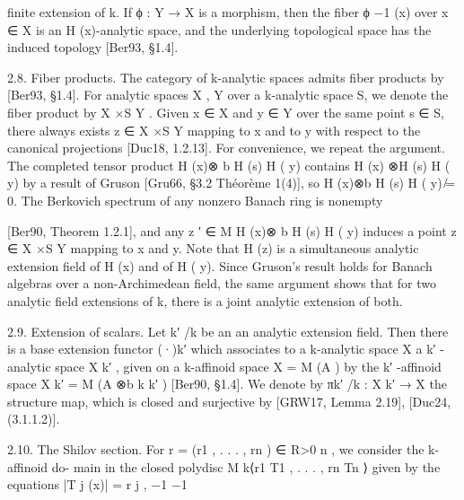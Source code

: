 \documentclass[
  10pt,
]{article}
\newenvironment{Shaded}{}{}
\newcommand{\NormalTok}[1]{#1}
\begin{document}
\begin{Shaded}
\begin{Highlighting}[]
\NormalTok{finite extension of k.}
\NormalTok{   If ϕ : Y → X is a morphism, then the fiber ϕ −1 (x) over x ∈ X is an H (x){-}analytic}
\NormalTok{space, and the underlying topological space has the induced topology [Ber93, §1.4].}

\NormalTok{2.8. Fiber products. The category of k{-}analytic spaces admits fiber products by [Ber93,}
\NormalTok{§1.4]. For analytic spaces X , Y over a k{-}analytic space S, we denote the fiber product by}
\NormalTok{X ×S Y . Given x ∈ X and y ∈ Y over the same point s ∈ S, there always exists z ∈ X ×S Y}
\NormalTok{mapping to x and to y with respect to the canonical projections [Duc18, 1.2.13]. For}
\NormalTok{convenience, we repeat the argument. The completed tensor product H (x)⊗         b H (s) H ( y)}
\NormalTok{contains H (x) ⊗H (s) H ( y) by a result of Gruson [Gru66, §3.2 Théorème 1(4)], so}
\NormalTok{H (x)⊗b H (s) H ( y) ̸= 0. The Berkovich spectrum of any nonzero Banach ring is nonempty}
                                                                 
\NormalTok{[Ber90, Theorem 1.2.1], and any z ′ ∈ M H (x)⊗     b H (s) H ( y) induces a point z ∈ X ×S Y}
\NormalTok{mapping to x and y. Note that H (z) is a simultaneous analytic extension field of H (x)}
\NormalTok{and of H ( y).}
\NormalTok{  Since Gruson’s result holds for Banach algebras over a non{-}Archimedean field, the}
\NormalTok{same argument shows that for two analytic field extensions of k, there is a joint analytic}
\NormalTok{extension of both.}

\NormalTok{2.9. Extension of scalars. Let k′ /k be an an analytic extension field. Then there is a}
\NormalTok{base extension functor (·)k′ which associates to a k{-}analytic space X a k′ {-}analytic space}
\NormalTok{X k′ , given on a k{-}affinoid space X = M (A ) by the k′ {-}affinoid space X k′ = M (A ⊗b k k′ )}
\NormalTok{[Ber90, §1.4]. We denote by πk′ /k : X k′ → X the structure map, which is closed and}
\NormalTok{surjective by [GRW17, Lemma 2.19], [Duc24, (3.1.1.2)].}

\NormalTok{2.10. The Shilov section. For r = (r1 , . . . , rn ) ∈ R\textgreater{}0     n}
\NormalTok{                                                                   , we consider the k{-}affinoid do{-}}
\NormalTok{main in the closed polydisc M k⟨r1 T1 , . . . , rn Tn ⟩ given by the equations |T j (x)| = r j ,}
\NormalTok{                                          −1            −1}


\end{Highlighting}
\end{Shaded}
\end{document}
